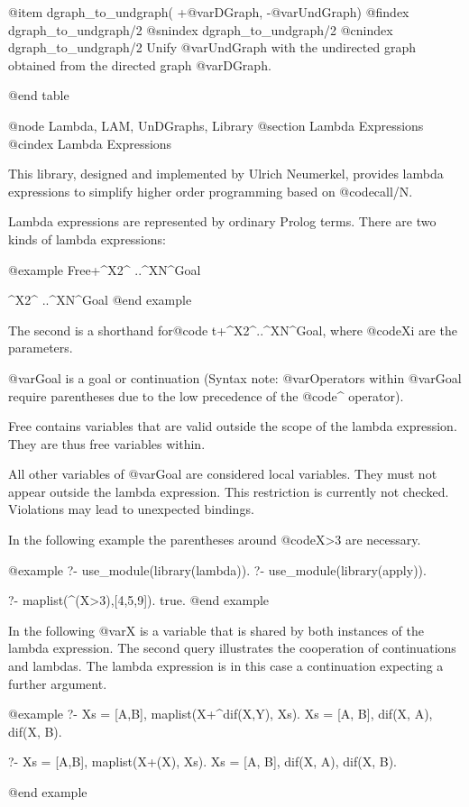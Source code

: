 {{{{{{{{{@item dgraph_to_undgraph( +@var{DGraph}, -@var{UndGraph})
@findex  dgraph_to_undgraph/2
@snindex dgraph_to_undgraph/2
@cnindex dgraph_to_undgraph/2
Unify @var{UndGraph} with the undirected graph obtained from the
directed graph @var{DGraph}.

@end table

@node Lambda, LAM, UnDGraphs, Library
@section Lambda Expressions
@cindex Lambda Expressions


This library, designed and implemented by Ulrich Neumerkel, provides
lambda expressions to simplify higher order programming based on @code{call/N}.

Lambda expressions are represented by ordinary Prolog terms.  There are
two kinds of lambda expressions:

@example
    Free+^X2^ ..^XN^Goal

         ^X2^ ..^XN^Goal
@end example

The second is a shorthand for@code{ t+^X2^..^XN^Goal}, where @code{Xi} are the parameters.

@var{Goal} is a goal or continuation (Syntax note: @var{Operators} within @var{Goal}
require parentheses due to the low precedence of the @code{^} operator).

Free contains variables that are valid outside the scope of the lambda
expression. They are thus free variables within.

All other variables of @var{Goal} are considered local variables. They must
not appear outside the lambda expression. This restriction is
currently not checked. Violations may lead to unexpected bindings.

In the following example the parentheses around @code{X>3} are necessary.

@example
?- use_module(library(lambda)).
?- use_module(library(apply)).

?- maplist(\X^(X>3),[4,5,9]).
true.
@end example

In the following @var{X} is a variable that is shared by both instances
of the lambda expression. The second query illustrates the cooperation
of continuations and lambdas. The lambda expression is in this case a
continuation expecting a further argument.

@example
?- Xs = [A,B], maplist(X+\Y^dif(X,Y), Xs).
Xs = [A, B],
dif(X, A),
dif(X, B).

?- Xs = [A,B], maplist(X+\dif(X), Xs).
Xs = [A, B],
dif(X, A),
dif(X, B).

@end example

}}}}}}}}}
